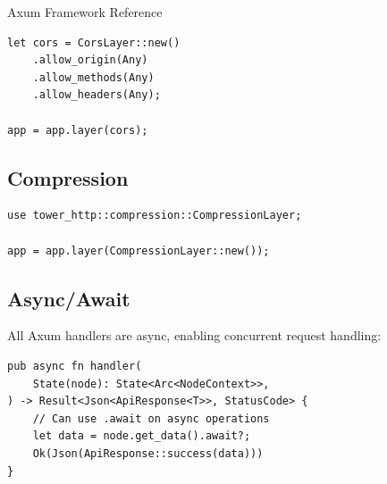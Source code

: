\begin{deepdive}{Axum Framework Reference}
\begin{listing}[H]
\begin{verbatim}
let cors = CorsLayer::new()
    .allow_origin(Any)
    .allow_methods(Any)
    .allow_headers(Any);

app = app.layer(cors);
\end{verbatim}
\end{listing}

\subsection{Compression}

\begin{listing}[H]
\caption{Axum compression setup}
\label{lst:axum-compression}
\begin{verbatim}
use tower_http::compression::CompressionLayer;

app = app.layer(CompressionLayer::new());
\end{verbatim}
\end{listing}

\subsection{Async/Await}

All Axum handlers are async, enabling concurrent request handling:

\begin{listing}[H]
\caption{Async handler pattern}
\label{lst:axum-async}
\begin{verbatim}
pub async fn handler(
    State(node): State<Arc<NodeContext>>,
) -> Result<Json<ApiResponse<T>>, StatusCode> {
    // Can use .await on async operations
    let data = node.get_data().await?;
    Ok(Json(ApiResponse::success(data)))
}
\end{verbatim}
\end{listing}

\end{deepdive}


